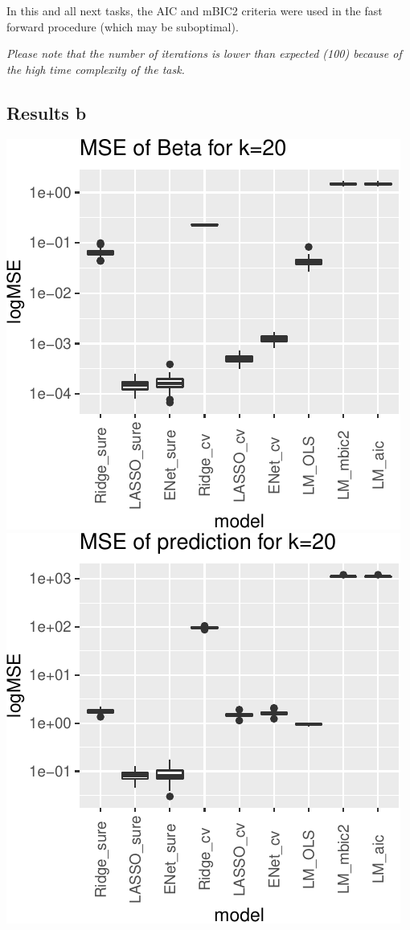 \documentclass[
]{article}
\begin{document}
In this and all next tasks, the AIC and mBIC2 criteria were used in the
fast forward procedure (which may be suboptimal).

\emph{Please note that the number of iterations is lower than expected
(100) because of the high time complexity of the task.}

\hypertarget{results-b}{%
\subsection{Results b}\label{results-b}}

\includegraphics[width=0.8\linewidth]{report_files/figure-latex/unnamed-chunk-15-1}
\includegraphics[width=0.8\linewidth]{report_files/figure-latex/unnamed-chunk-15-2}
\end{document}
